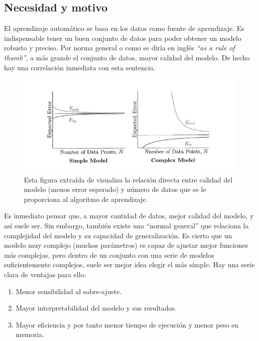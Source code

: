 \subsection{Necesidad y motivo}
El aprendizaje automático se basa en los datos como fuente de aprendizaje. Es indispensable tener un buen conjunto de datos para poder obtener un modelo robusto y preciso. Por norma general o como se diría en inglés \textit{``as a rule of thumb''}, a más grande el conjunto de datos, mayor calidad del modelo. De hecho hay una correlación inmediata con esta sentencia.

\begin{figure}[htp]
    \begin{center}
        \includegraphics[width=1\textwidth]{imagenes/learning_from_data_vc.png}
    \end{center}
    \caption[Correlación entre error del modelo y N]{Esta figura extraída de \cite{Mostafa2012} visualiza la relación directa entre calidad del modelo (menos error esperado) y número de datos que se le proporciona al algoritmo de aprendizaje.}
    \label{fig:learning_from_data_vc}
\end{figure}

Es inmediato pensar que, a mayor cantidad de datos, mejor calidad del modelo, y así suele ser. Sin embargo, también existe una ``normal general'' que relaciona la complejidad del modelo y su capacidad de generalización. Es cierto que un modelo muy complejo (muchos parámetros) es capaz de ajustar mejor funciones más complejas, pero dentro de un conjunto con una serie de modelos suficientemente complejos, suele ser mejor idea elegir el más simple. Hay una serie clara de ventajas para ello:
\begin{enumerate}
    \item Menor  sensibilidad al sobre-ajuste.
    \item Mayor interpretabilidad del modelo y sus resultados.
    \item Mayor eficiencia y por tanto menor tiempo de ejecución y menor peso en memoria.
\end{enumerate}

